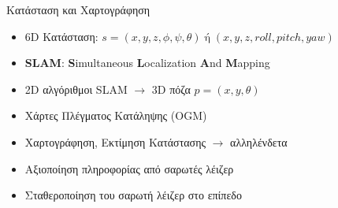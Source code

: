 \documentclass[10pt, compress]{beamer}
\begin{document}
\begin{frame}{Κατάσταση και Χαρτογράφηση}

	\begin{itemize}
		\item 6D Κατάσταση:  $s=(x,y,z,\phi,\psi,\theta)\; \text{ή}\; (x,y,z,roll,pitch,yaw)$
    	\item	\textbf{SLAM}: \textbf{S}imultaneous \textbf{L}ocalization \textbf{A}nd \textbf{M}apping
		\item 2D αλγόριθμοι SLAM $\rightarrow$ 3D πόζα $p=(x,y,\theta)$
		\item Χάρτες Πλέγματος Κατάληψης (OGM)
		\item Χαρτογράφηση, Εκτίμηση Κατάστασης $\rightarrow$ αλληλένδετα
		\item Αξιοποίηση πληροφορίας από σαρωτές λέιζερ
		\item Σταθεροποίηση του σαρωτή λέιζερ στο επίπεδο
	\end{itemize}
	\vspace{-0.5cm}
	\begin{figure}[!ht]
		\hspace{0.1cm}
	\end{figure}		
\end{frame}
\end{document}
